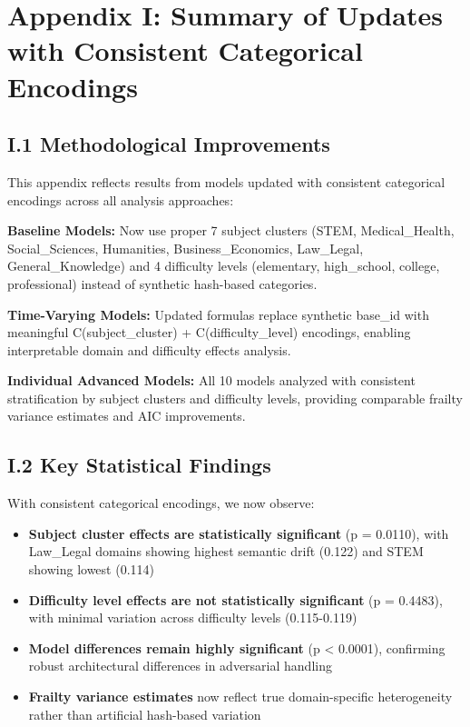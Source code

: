 \documentclass[letterpaper]{article}
\begin{document}
\section*{Appendix I: Summary of Updates with Consistent Categorical Encodings}
\label{app:updates}

\subsection*{I.1 Methodological Improvements}

This appendix reflects results from models updated with consistent categorical encodings across all analysis approaches:

\textbf{Baseline Models:} Now use proper 7 subject clusters (STEM, Medical\_Health, Social\_Sciences, Humanities, Business\_Economics, Law\_Legal, General\_Knowledge) and 4 difficulty levels (elementary, high\_school, college, professional) instead of synthetic hash-based categories.

\textbf{Time-Varying Models:} Updated formulas replace synthetic base\_id with meaningful C(subject\_cluster) + C(difficulty\_level) encodings, enabling interpretable domain and difficulty effects analysis.

\textbf{Individual Advanced Models:} All 10 models analyzed with consistent stratification by subject clusters and difficulty levels, providing comparable frailty variance estimates and AIC improvements.

\subsection*{I.2 Key Statistical Findings}

With consistent categorical encodings, we now observe:

\begin{itemize}
\item \textbf{Subject cluster effects are statistically significant} (p = 0.0110), with Law\_Legal domains showing highest semantic drift (0.122) and STEM showing lowest (0.114)
\item \textbf{Difficulty level effects are not statistically significant} (p = 0.4483), with minimal variation across difficulty levels (0.115-0.119)
\item \textbf{Model differences remain highly significant} (p < 0.0001), confirming robust architectural differences in adversarial handling
\item \textbf{Frailty variance estimates} now reflect true domain-specific heterogeneity rather than artificial hash-based variation
\end{itemize}
\end{document}
